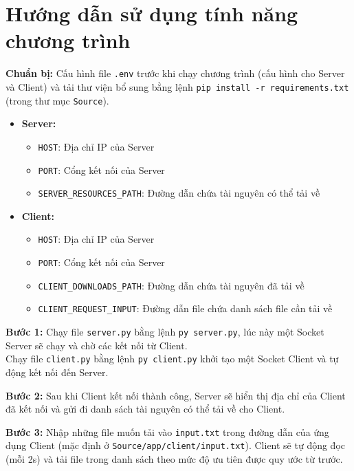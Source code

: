 \documentclass[a4paper,12pt]{report}
\begin{document}
\section{Hướng dẫn sử dụng tính năng chương trình}
\begin{description}
  \item \textbf{Chuẩn bị:} Cấu hình file \verb|.env| trước khi chạy chương trình (cấu hình cho Server và Client) và tải thư viện bổ sung bằng lệnh \verb|pip install -r requirements.txt| (trong thư mục \verb|Source|).
        \begin{itemize}
          \item \textbf{Server:}
                \begin{itemize}
                  \item \verb|HOST|: Địa chỉ IP của Server
                  \item \verb|PORT|: Cổng kết nối của Server
                  \item \verb|SERVER_RESOURCES_PATH|: Đường dẫn chứa tài nguyên có thể tải về
                \end{itemize}
          \item \textbf{Client:}
                \begin{itemize}
                  \item \verb|HOST|: Địa chỉ IP của Server
                  \item \verb|PORT|: Cổng kết nối của Server
                  \item \verb|CLIENT_DOWNLOADS_PATH|: Đường dẫn chứa tài nguyên đã tải về
                  \item \verb|CLIENT_REQUEST_INPUT|: Đường dẫn file chứa danh sách file cần tải về
                \end{itemize}
        \end{itemize}
  \item \textbf{Bước 1:} Chạy file \verb|server.py| bằng lệnh \verb|py server.py|, lúc này một Socket Server sẽ chạy và chờ các kết nối từ Client.\\Chạy file \verb|client.py| bằng lệnh \verb|py client.py| khởi tạo một Socket Client và tự động kết nối đến Server.
  \item \textbf{Bước 2:} Sau khi Client kết nối thành công, Server sẽ hiển thị địa chỉ của Client đã kết nối và gửi đi danh sách tài nguyên có thể tải về cho Client.
  \item \textbf{Bước 3:} Nhập những file muốn tải vào \verb|input.txt| trong đường dẫn của ứng dụng Client (mặc định ở \verb|Source/app/client/input.txt|). Client sẽ tự động đọc (mỗi 2s) và tải file trong danh sách theo mức độ ưu tiên được quy ước từ trước.\\ \\

\end{description}
\end{document}
